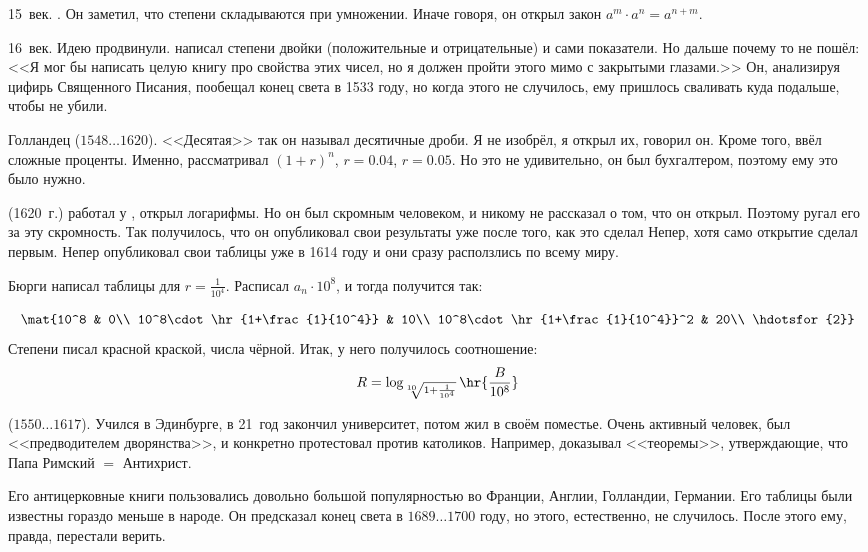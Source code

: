 \documentclass[a4paper,oneside,fleqn,10pt]{article}
\newcommand{\pe}[2]{${#1}\ldots{#2}$}
\begin{document}
15~век. . Он заметил, что степени складываются при умножении.
Иначе говоря, он открыл закон $a^m \cdot a^n = a^{n+m}$.

16~век. Идею продвинули.  написал степени двойки (положительные и отрицательные)
и сами показатели. Но дальше почему то не пошёл: <<Я мог бы написать целую книгу про свойства этих чисел,
но я должен пройти этого мимо с закрытыми глазами.>> Он, анализируя цифирь Священного Писания,
пообещал конец света в 1533 году, но когда этого не случилось, ему пришлось сваливать куда
подальше, чтобы не убили.

Голландец  (\pe{1548}{1620}). <<Десятая>> так он называл
десятичные дроби. Я не изобрёл,
я открыл их, говорил он. Кроме того, ввёл сложные проценты. Именно,
рассматривал $(1+r)^n$, $r = 0.04$, $r = 0.05$.
Но это не удивительно, он был бухгалтером, поэтому ему это было нужно.

 (1620~г.) работал у , открыл логарифмы. Но он был скромным человеком,
и никому не рассказал о том, что он открыл. Поэтому  ругал его за эту скромность.
Так получилось, что он опубликовал свои результаты уже после того, как это сделал Непер,
хотя само открытие сделал первым.
Непер опубликовал свои таблицы уже в 1614 году и они сразу расползлись по всему миру.

Бюрги написал таблицы для $r = \frac{1}{10^4}$. Расписал $a_n\cdot 10^8$,
и тогда получится так:

$$\mat{10^8 & 0\\
10^8\cdot\hr{1+\frac{1}{10^4}} & 10\\
10^8\cdot\hr{1+\frac{1}{10^4}}^2 & 20\\
\hdotsfor{2}}$$
Степени писал красной краской, числа чёрной.
Итак, у него получилось соотношение:
$$R = \log_{\sqrt[10]{1+\frac{1}{10^4}}} \hr{\frac{B}{10^8}}$$

 (\pe{1550}{1617}).
Учился в Эдинбурге, в 21~год закончил университет, потом жил в своём поместье.
Очень активный человек, был <<предводителем дворянства>>, и конкретно протестовал
против католиков. Например, доказывал <<теоремы>>, утверждающие, что Папа Римский $=$ Антихрист.

Его антицерковные книги пользовались довольно большой популярностью во Франции, Англии, Голландии, Германии.
Его таблицы были известны гораздо меньше в народе.
Он предсказал конец света в \pe{1689}{1700} году, но этого, естественно, не случилось.
После этого ему, правда, перестали верить.
\end{document}
